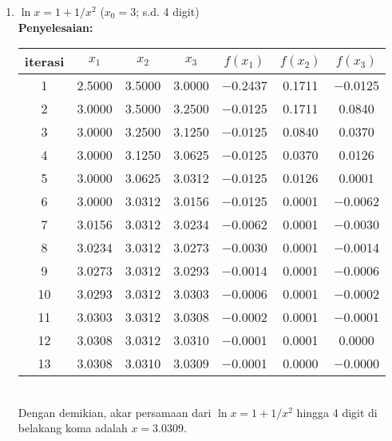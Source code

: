 \documentclass{article}
\newcommand{\penyelesaian}{\textbf{Penyelesaian: }}
\begin{document}
\begin{enumerate}
\begin{enumerate}
        \item $\ln{x} = 1 + 1/x^2$ ($x_0 = \num{3}$; s.d. 4 digit) \\
        \penyelesaian \\
        \begin{tabular}{|c|c|c|c|c|c|c|}
            \hline
            iterasi & $x_1$ & $x_2$ & $x_3$ & $f(x_1)$ & $f(x_2)$ & $f(x_3)$ \\
            \hline
            1 & \num{2,5000} & \num{3,5000} & \num{3,0000} & \num{-0,2437} & \num{0,1711} & \num{-0,0125}\\
            2 & \num{3,0000} & \num{3,5000} & \num{3,2500} & \num{-0,0125} & \num{0,1711} & \num{0,0840}\\
            3 & \num{3,0000} & \num{3,2500} & \num{3,1250} & \num{-0,0125} & \num{0,0840} & \num{0,0370}\\
            4 & \num{3,0000} & \num{3,1250} & \num{3,0625} & \num{-0,0125} & \num{0,0370} & \num{0,0126}\\
            5 & \num{3,0000} & \num{3,0625} & \num{3,0312} & \num{-0,0125} & \num{0,0126} & \num{0,0001}\\
            6 & \num{3,0000} & \num{3,0312} & \num{3,0156} & \num{-0,0125} & \num{0,0001} & \num{-0,0062}\\
            7 & \num{3,0156} & \num{3,0312} & \num{3,0234} & \num{-0,0062} & \num{0,0001} & \num{-0,0030}\\
            8 & \num{3,0234} & \num{3,0312} & \num{3,0273} & \num{-0,0030} & \num{0,0001} & \num{-0,0014}\\
            9 & \num{3,0273} & \num{3,0312} & \num{3,0293} & \num{-0,0014} & \num{0,0001} & \num{-0,0006}\\
            10 & \num{3,0293} & \num{3,0312} & \num{3,0303} & \num{-0,0006} & \num{0,0001} & \num{-0,0002}\\
            11 & \num{3,0303} & \num{3,0312} & \num{3,0308} & \num{-0,0002} & \num{0,0001} & \num{-0,0001}\\
            12 & \num{3,0308} & \num{3,0312} & \num{3,0310} & \num{-0,0001} & \num{0,0001} & \num{0,0000}\\
            13 & \num{3,0308} & \num{3,0310} & \num{3,0309} & \num{-0,0001} & \num{0,0000} & \num{-0,0000}\\
             \hline
            \end{tabular} \\      
        Dengan demikian, akar persamaan dari $\ln{x} = 1 + 1/x^2$ hingga 4 digit di belakang koma adalah $x = \num{3,0309}$.     


\end{enumerate}
\end{enumerate}
\end{document}
